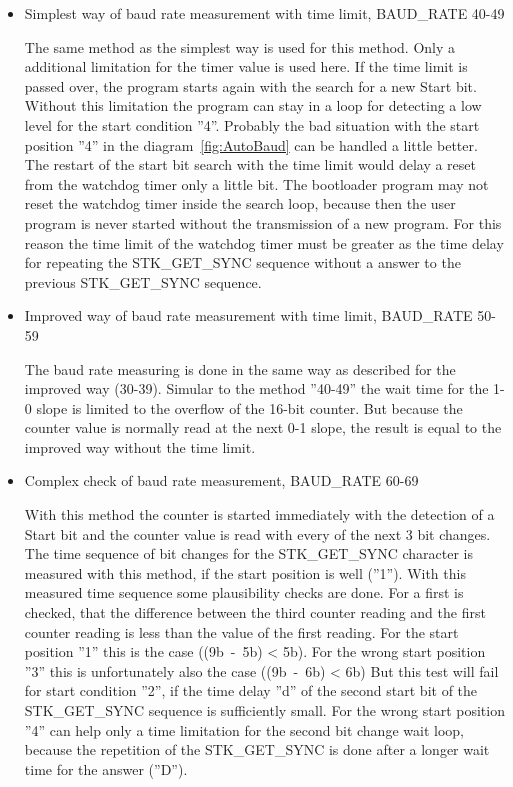 \begin{itemize}
\item {Simplest way of baud rate measurement with time limit, BAUD\_RATE 40-49}

The same method as the simplest way is used for this method.
Only a additional limitation for the timer value is used here.
If the time limit is passed over, the program starts again with the search
for a new Start bit.
Without this limitation the program can stay in a loop for detecting
a low level for the start condition ''4''. 
Probably the bad situation with the start position ''4'' in the 
diagram~\ref{fig:AutoBaud} can be handled a little better. 
The restart of the start bit search with the time limit would
delay a reset from the watchdog timer only a little bit.
The bootloader program may not reset the watchdog timer inside
the search loop, because then the user program is never started
without the transmission of a new program.
For this reason the time limit of the watchdog timer must be greater
as the time delay for repeating the STK\_GET\_SYNC sequence
without a answer to the previous STK\_GET\_SYNC sequence.

\item {Improved way of baud rate measurement with time limit, BAUD\_RATE 50-59}

The baud rate measuring is done in the same way as described for the
improved way (30-39).
Simular to the method ''40-49'' the wait time for the 1-0 slope
is limited to the overflow of the 16-bit counter.
But because the counter value is normally read at the next 0-1 slope,
the result is equal to the improved way without the time limit.


\item {Complex check of baud rate measurement, BAUD\_RATE 60-69}

With this method the counter is started immediately with the detection
of a Start bit and the counter value is read with every of the
next 3 bit changes.
The time sequence of bit changes for the STK\_GET\_SYNC character is 
measured with this method, if the start position is well (''1'').
With this measured time sequence some plausibility checks are done.
For a first is checked, that the difference between the third counter
reading and the first counter reading is less than the value
of the first reading.
For the start position ''1'' this is the case ((9b~-~5b) < 5b).
For the wrong start position ''3'' this is unfortunately also the case ((9b~-~6b) < 6b)
But this test will fail for start condition ''2'', if the time delay ''d'' of
the second start bit of the STK\_GET\_SYNC sequence is sufficiently small.
For the wrong start position ''4'' can help only a time limitation for
the second bit change wait loop, because the repetition of the STK\_GET\_SYNC
is done after a longer wait time for the answer (''D''). 


\end{itemize}

